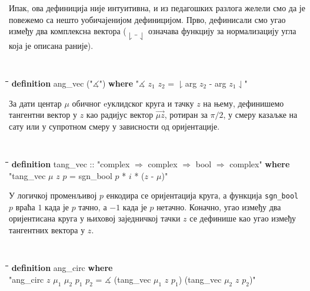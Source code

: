Ипак, ова дефиниција није интуитивна, и из педагошких разлога желели
смо да је повежемо са нешто уобичајенијом дефиницијом. Прво,
дефинисали смо угао између два комплексна вектора ($\downharpoonright
\_ \downharpoonleft$ означава функцију за нормализацију угла која је
описана раније).  
{\tt
  \begin{tabbing}
    \hspace{5mm}\=\hspace{5mm}\=\hspace{5mm}\=\hspace{5mm}\=\hspace{5mm}\=\kill
\textbf{definition} ang\_vec ("$\measuredangle$") \textbf{where} "$\measuredangle$ $z_1$ $z_2$ = $\downharpoonright$arg $z_2$ - arg $z_1$$\downharpoonleft$"    
  \end{tabbing}
}

За дати центар $\mu$ обичног eуклидског круга и тачку $z$ на њему,
дефинишемо тангентни вектор у $z$ као радијус вектор
$\overrightarrow{\mu z}$, ротиран за $\pi/2$, у смеру казаљке на сату
или у супротном смеру у зависности од оријентације.  
{\tt
  \begin{tabbing}
    \hspace{5mm}\=\hspace{5mm}\=\hspace{5mm}\=\hspace{5mm}\=\hspace{5mm}\=\kill
\textbf{definition} tang\_vec :: "complex $\Rightarrow$ complex $\Rightarrow$ bool $\Rightarrow$ complex" \textbf{where}\\
\>"tang\_vec $\mu$ $z$ $p$ = sgn\_bool $p$ * $i$ * ($z$ - $\mu$)"
  \end{tabbing}
}
\noindent У логичкој променљивој $p$ енкодира се оријентација круга, а
функција \mbox{{\tt sgn\_bool $p$}} враћа $1$ када је $p$ тачно, а $-1$ када
је $p$ нетачно. Коначно, угао између два оријентисана круга у њиховој
заједничкој тачки $z$ се дефинише као угао између тангентних вектора у
$z$.

{\tt
  \begin{tabbing}
    \hspace{5mm}\=\hspace{5mm}\=\hspace{5mm}\=\hspace{5mm}\=\hspace{5mm}\=\kill
\textbf{definition} ang\_circ \textbf{where}\\
\> "ang\_circ $z$ $\mu_1$ $\mu_2$ $p_1$ $p_2$ = $\measuredangle$ (tang\_vec $\mu_1$ $z$ $p_1$) (tang\_vec $\mu_2$ $z$ $p_2$)"
  \end{tabbing}
}

